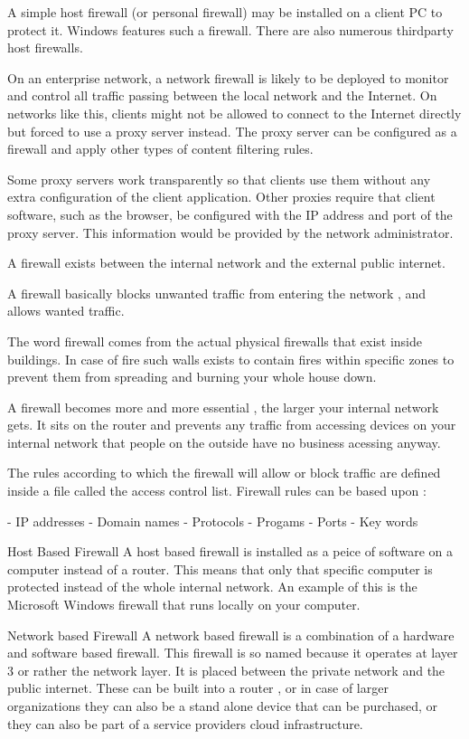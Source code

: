 A simple host firewall (or personal firewall) may be installed on a client PC to
protect it. Windows features such a firewall. There are also numerous thirdparty
host firewalls.

On an enterprise network, a network firewall is likely to be deployed to monitor
and control all traffic passing between the local network and the Internet. On
networks like this, clients might not be allowed to connect to the Internet
directly but forced to use a proxy server instead. The proxy server can be
configured as a firewall and apply other types of content filtering rules.

Some proxy servers work transparently so that clients use them without any extra
configuration of the client application. Other proxies require that client
software, such as the browser, be configured with the IP address and port of the
proxy server. This information would be provided by the network administrator. 


A firewall exists between the internal network and the external public internet.

A firewall basically blocks unwanted traffic from entering the network , and
allows wanted traffic.

The word firewall comes from the actual physical firewalls that exist inside
buildings. In case of fire such walls exists to contain fires within specific
zones to prevent them from spreading and burning your whole house down.

A firewall becomes more and more essential , the larger your internal network
gets. It sits on the router and prevents any traffic from accessing devices on
your internal network that people on the outside have no business acessing
anyway.

The rules according to which the firewall will allow or block traffic are
defined inside a file called the access control list. Firewall rules can be
based upon :

- IP addresses
- Domain names
- Protocols
- Progams
- Ports
- Key words

Host Based Firewall
A host based firewall is installed as a peice of software on a computer instead
of a router. This means that only that specific computer is protected instead of
the whole internal network. An example of this is the Microsoft Windows firewall
that runs locally on your computer.

Network based Firewall
A network based firewall is a combination of a hardware and software based
firewall. This firewall is so named because it operates at layer 3 or rather the
network layer. It is placed between the private network and the public internet.
These can be built into a router , or in case of larger organizations they can
also be a stand alone device that can be purchased, or they can also be part of
a service providers cloud infrastructure.

